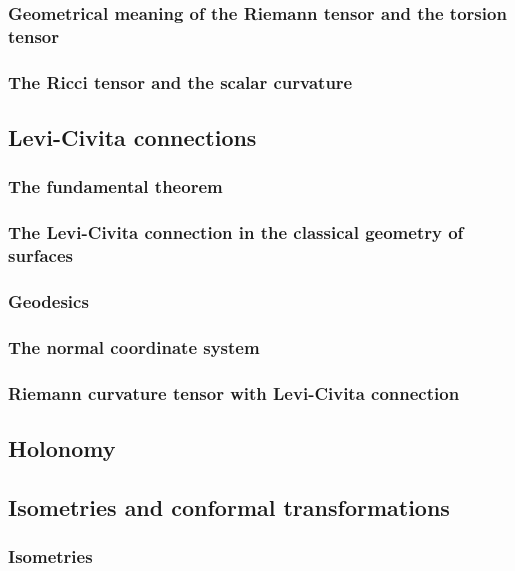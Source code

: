 \documentclass[twoside]{amsart}
\begin{document}
\subsubsection{ Geometrical meaning of the Riemann tensor and the torsion tensor }

\subsubsection{ The Ricci tensor and the scalar curvature }

\subsection{ Levi-Civita connections }

\subsubsection{ The fundamental theorem }

\subsubsection{ The Levi-Civita connection in the classical geometry of surfaces }

\subsubsection{ Geodesics }

\subsubsection{ The normal coordinate system }

\subsubsection{ Riemann curvature tensor with Levi-Civita connection}

\subsection{ Holonomy }

\subsection{ Isometries and conformal transformations }

\subsubsection{ Isometries }
\end{document}

